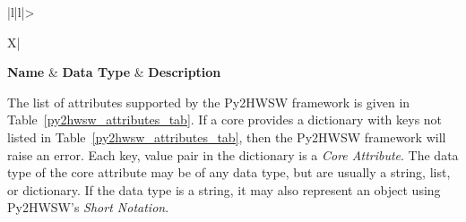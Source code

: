 %
%

{
\setlength{\LTcapwidth}{\linewidth} %
\begin{xltabular}{\textwidth}{|l|l|>{\raggedright\arraybackslash}X|}
  \hline
  {\bf Name} & {\bf Data Type} & {\bf Description}  \\ \hline \hline
  \endfirsthead
  \hline
  \caption{Supported Py2HWSW attributes in the \textbf{Core Dictionary}. The \textit{Data Type} column specifies the type of internal object that the Py2HWSW will convert the attribute's value to (usually the user inputs a string, list, or dictionary value and then py2 converts it to an internal object).}
  \endlastfoot

  

  \label{py2hwsw_attributes_tab}
\end{xltabular}
}

The list of attributes supported by the Py2HWSW framework is given in Table~\ref{py2hwsw_attributes_tab}.
If a core provides a dictionary with keys not listed in Table~\ref{py2hwsw_attributes_tab}, then the Py2HWSW framework will raise an error.
Each key, value pair in the dictionary is a \textit{Core Attribute}.
The data type of the core attribute may be of any data type, but are usually a string, list, or dictionary.
If the data type is a string, it may also represent an object using Py2HWSW's \textit{Short Notation}.
